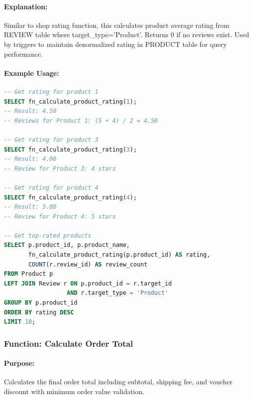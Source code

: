 \paragraph{Explanation:}
Similar to shop rating function, this calculates product average rating from REVIEW table where target\_type='Product'. Returns 0 if no reviews exist. Used by triggers to maintain denormalized rating in PRODUCT table for query performance.

\paragraph{Example Usage:}

\begin{lstlisting}[language=SQL]
-- Get rating for product 1
SELECT fn_calculate_product_rating(1);
-- Result: 4.50
-- Reviews for Product 1: (5 + 4) / 2 = 4.50

-- Get rating for product 3
SELECT fn_calculate_product_rating(3);
-- Result: 4.00
-- Review for Product 3: 4 stars

-- Get rating for product 4
SELECT fn_calculate_product_rating(4);
-- Result: 5.00
-- Review for Product 4: 5 stars

-- Get top-rated products
SELECT p.product_id, p.product_name, 
       fn_calculate_product_rating(p.product_id) AS rating,
       COUNT(r.review_id) AS review_count
FROM Product p
LEFT JOIN Review r ON p.product_id = r.target_id 
                  AND r.target_type = 'Product'
GROUP BY p.product_id
ORDER BY rating DESC
LIMIT 10;
\end{lstlisting}

\subsubsection{Function: Calculate Order Total}

\paragraph{Purpose:} Calculates the final order total including subtotal, shipping fee, and voucher discount with minimum order value validation.

